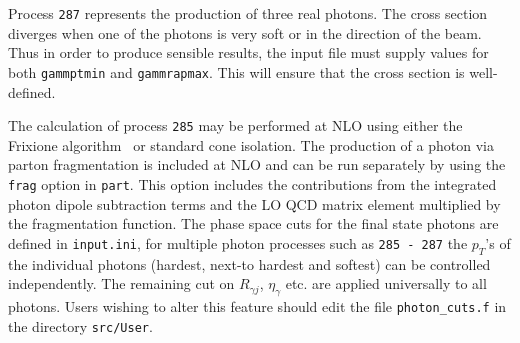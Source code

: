 \label{subsec:trigam}

Process {\tt 287} represents the production of three real photons.
The cross section diverges
when one of the photons is very soft or in the direction of the beam.
Thus in order to produce sensible results, the input file must supply values for both
{\tt gammptmin} and {\tt gammrapmax}. This will ensure that
the cross section is well-defined.

The calculation of process {\tt 285} may be performed at NLO using either the
Frixione algorithm~\cite{Frixione:1998jh} or standard cone isolation.  The production of a photon via parton
fragmentation is included at NLO and
can be run separately by using the {\tt frag} option in {\tt part}. This option includes the contributions from the
integrated
photon dipole subtraction terms and the LO QCD matrix element multiplied by the fragmentation function.
The phase space cuts for the final state photons are defined in {\tt{input.ini}}, for multiple photon processes such
as {\tt 285 - 287} the $p_T$'s of the individual photons (hardest, next-to hardest and softest) can be controlled
independently.
The remaining cut on $R_{\gamma j}$, $\eta_{\gamma}$ etc. are applied universally to all photons. Users wishing to alter
this feature should edit the file {\tt{photon\_cuts.f}} in the directory {\tt{src/User}}.
